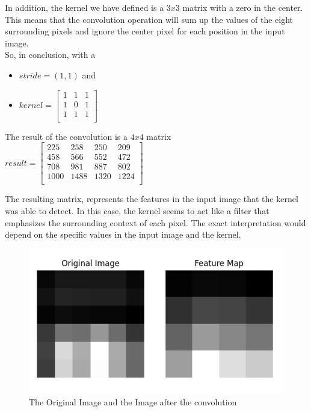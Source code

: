 In addition, the kernel we have defined is a $3 x 3$ matrix with a zero in the center. This means that the convolution operation will sum up the values of the eight surrounding pixels and ignore the center pixel for each position in the input image.\\

So, in conclusion, with a
\begin{itemize}
	\item $stride = \left(1,1\right)$ and 
	\item $	kernel = \begin{bmatrix}
		1 & 1 & 1  \\
		1 & 0 & 1  \\
		1 & 1 & 1  \\
	\end{bmatrix}$
\end{itemize}

The result of the convolution is a $ 4 x 4$ matrix\\

$	result = \begin{bmatrix}
	225 & 258 & 250 & 209  \\
	458 & 566 & 552 & 472  \\
	708 & 981 & 887 & 802  \\
	1000 & 1488 & 1320 &1224 \\
\end{bmatrix}$
\vspace{6mm}

The resulting matrix, represents the features in the input image that the kernel was able to detect. In this case, the kernel seems to act like a filter that emphasizes the surrounding context of each pixel. The exact interpretation would depend on the specific values in the input image and the kernel. 

\begin{figure}[H]
	\centering
	\includegraphics[width=.7\textwidth]{../Problem 11/conv_result.pdf}
	\caption{The Original Image and the Image after the convolution}
\end{figure}


